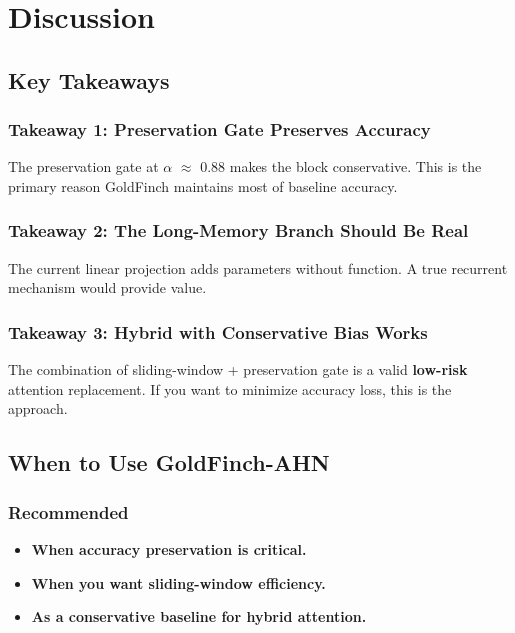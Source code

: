 
\section{Discussion}

\subsection{Key Takeaways}

\subsubsection{Takeaway 1: Preservation Gate Preserves Accuracy}

The preservation gate at $\alpha$ $\approx$ 0.88 makes the block conservative. This is 
the primary reason GoldFinch maintains most of baseline accuracy.

\subsubsection{Takeaway 2: The Long-Memory Branch Should Be Real}

The current linear projection adds parameters without function. A true 
recurrent mechanism would provide value.

\subsubsection{Takeaway 3: Hybrid with Conservative Bias Works}

The combination of sliding-window + preservation gate is a valid 
\textbf{low-risk} attention replacement. If you want to minimize accuracy 
loss, this is the approach.

\subsection{When to Use GoldFinch-AHN}

\subsubsection{Recommended}

\begin{itemize}
\item \textbf{When accuracy preservation is critical.}
\item \textbf{When you want sliding-window efficiency.}
\item \textbf{As a conservative baseline for hybrid attention.}

\end{itemize}

